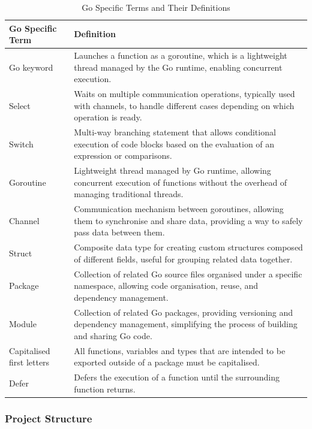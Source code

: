 \documentclass[12pt, conference, final, a4paper, onecolumn, compsoc]{IEEEtran}
\begin{document}
\begin{table}[H]
  \centering
  \begin{tabular}{|l|p{}|}
    \hline
    \textbf{Go Specific Term} & \textbf{Definition} \\
    \hline
    Go keyword & Launches a function as a goroutine, which is a lightweight thread managed by the Go runtime, enabling concurrent execution. \\
    \hline
    Select    & Waits on multiple communication operations, typically used with channels, to handle different cases depending on which operation is ready. \\
    \hline
    Switch    & Multi-way branching statement that allows conditional execution of code blocks based on the evaluation of an expression or comparisons. \\
    \hline
    Goroutine & Lightweight thread managed by Go runtime, allowing concurrent execution of functions without the overhead of managing traditional threads. \\
    \hline
    Channel   & Communication mechanism between goroutines, allowing them to synchronise and share data, providing a way to safely pass data between them. \\
    \hline
    Struct    & Composite data type for creating custom structures composed of different fields, useful for grouping related data together. \\
    \hline
    Package   & Collection of related Go source files organised under a specific namespace, allowing code organisation, reuse, and dependency management. \\
    \hline
    Module    & Collection of related Go packages, providing versioning and dependency management, simplifying the process of building and sharing Go code. \\
    \hline
    Capitalised first letters & All functions, variables and types that are
                                intended to be exported outside of a package must be capitalised. \\
    \hline
    Defer & Defers the execution of a function until the surrounding function returns. \\
    \hline
  \end{tabular}
  \caption{Go Specific Terms and Their Definitions}
  \label{table:go-terms}
\end{table}

\subsubsection*{Project Structure}
\end{document}
